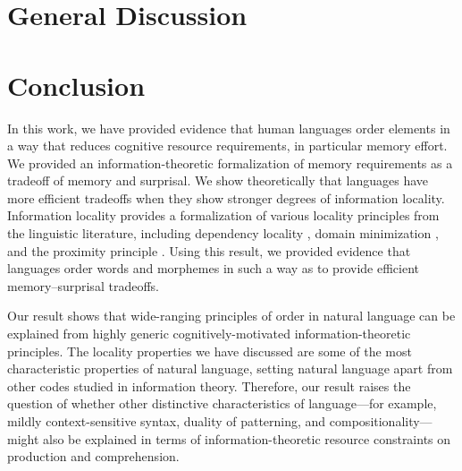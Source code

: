 \documentclass[man]{apa7}
\newcommand{\citep}{\parencite}
\begin{document}



\section{General Discussion}\label{sec:discussion}




\section{Conclusion}\label{sec:conclusion}

In this work, we have provided evidence that human languages order elements in a way that reduces cognitive resource requirements, in particular memory effort.
We provided an information-theoretic formalization of memory requirements as a tradeoff of memory and surprisal.
We show theoretically that languages have more efficient tradeoffs when they show stronger degrees of information locality.
Information locality provides a formalization of various locality principles from the linguistic literature, including dependency locality \citep{gibson1998linguistic}, domain minimization \citep{hawkins2004efficiency}, and the proximity principle \citep{givon1985iconicity}.
Using this result, we provided evidence that languages order words and morphemes in such a way as to provide efficient memory--surprisal tradeoffs.

Our result shows that wide-ranging principles of order in natural language can be explained from highly generic cognitively-motivated information-theoretic principles. The locality properties we have discussed are some of the most characteristic properties of natural language, setting natural language apart from other codes studied in information theory.
Therefore, our result raises the question of whether other distinctive characteristics of language---for example, mildly context-sensitive syntax, duality of patterning, and compositionality---might also be explained in terms of information-theoretic resource constraints on production and comprehension.






\printbibliography
\end{document}
